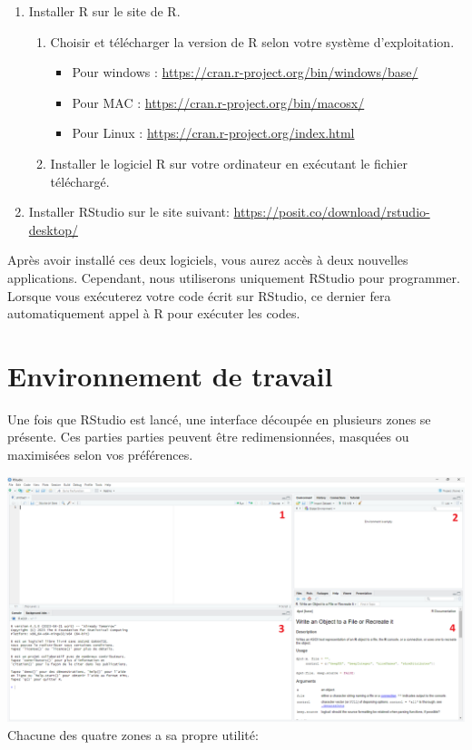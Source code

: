 \documentclass[
]{book}
\providecommand{\tightlist}{%
  \setlength{\itemsep}{0pt}\setlength{\parskip}{0pt}}
\begin{document}
\begin{enumerate}
\def\labelenumi{\arabic{enumi}.}
\tightlist
\item
  Installer R sur le site de R.

  \begin{enumerate}
  \def\labelenumii{\roman{enumii}.}
  \tightlist
  \item
    Choisir et télécharger la version de R selon votre système d'exploitation.

    \begin{itemize}
    \tightlist
    \item
      Pour windows : \url{https://cran.r-project.org/bin/windows/base/}
    \item
      Pour MAC : \url{https://cran.r-project.org/bin/macosx/}
    \item
      Pour Linux : \url{https://cran.r-project.org/index.html}
    \end{itemize}
  \item
    Installer le logiciel R sur votre ordinateur en exécutant le fichier téléchargé.
  \end{enumerate}
\item
  Installer RStudio sur le site suivant: \url{https://posit.co/download/rstudio-desktop/}
\end{enumerate}

Après avoir installé ces deux logiciels, vous aurez accès à deux nouvelles applications. Cependant, nous utiliserons uniquement RStudio pour programmer. Lorsque vous exécuterez votre code écrit sur RStudio, ce dernier fera automatiquement appel à R pour exécuter les codes.

\section{Environnement de travail}\label{environnement-de-travail}

Une fois que RStudio est lancé, une interface découpée en plusieurs zones se présente. Ces parties parties peuvent être redimensionnées, masquées ou maximisées selon vos préférences.

\includegraphics[width=26.67in]{images/environnement}
Chacune des quatre zones a sa propre utilité:
\end{document}
